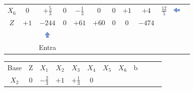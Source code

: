 \begin{frame}
{\begin{table}
\begin{tabular}{c c c c c c c c c c c c}
				\cellcolor{blue!100} \color{red} $\scriptstyle X_6$
				& \cellcolor{yellow!50} $\scriptstyle 0$
				& \cellcolor{gray!50} $\scriptstyle +\frac{5}{3}$
				& \cellcolor{yellow!50} $\scriptstyle 0$
				& \cellcolor{yellow!50} $\scriptstyle -\frac{1}{3}$
				& \cellcolor{yellow!50} $\scriptstyle 0$
				& \cellcolor{yellow!50} $\scriptstyle 0$
				& \cellcolor{yellow!50} $\scriptstyle +1$
				& \cellcolor{gray!50} $\scriptstyle +4$ 
				& $ \scriptstyle \frac{12}{5}$ & \includegraphics[width=0.3cm,height=0.3cm]{setaesquerda.jpg}\\
				\cellcolor{blue!100} \color{white} $\scriptstyle Z$
				& \cellcolor{yellow!50} $\scriptstyle +1$
				& \cellcolor{gray!50} $\scriptstyle -244$
				& \cellcolor{yellow!50} $\scriptstyle 0$
				& \cellcolor{yellow!50} $\scriptstyle +61$
				& \cellcolor{yellow!50} $\scriptstyle +60$
				& \cellcolor{yellow!50} $\scriptstyle 0$
				& \cellcolor{yellow!50} $\scriptstyle 0$ 
				& \cellcolor{gray!50} $\scriptstyle -474$  \\
				& & \includegraphics[width=0.3cm,height=0.3cm]{setacima.jpg} \\
				& & \scriptsize Entra \\
			\end{tabular}
		\end{table}			
	}
	{
		\begin{table}		
			\begin{tabular}{c c c c c c c c c c c c}
				\cellcolor{blue!100} \color{white} \scriptsize Base 
				&\cellcolor{blue!100} \color{white} \scriptsize Z 
				&\cellcolor{blue!100} \color{white} $\scriptstyle X_1$ 
				&\cellcolor{blue!100} \color{red} $\scriptstyle X_2$ 
				&\cellcolor{blue!100} \color{white}   $\scriptstyle X_3$ 
				&\cellcolor{blue!100} \color{white} $\scriptstyle X_4$ 
				&\cellcolor{blue!100} \color{red}   $\scriptstyle X_5$ 
				&\cellcolor{blue!100} \color{red}   $\scriptstyle X_6$ 
				&\cellcolor{blue!100} \color{white} \scriptsize b
				&
				&
				& \\
				\cellcolor{blue!100} \color{red} $\scriptstyle X_2$
				& \cellcolor{yellow!50} $\scriptstyle 0$
				& \cellcolor{gray!50} $\scriptstyle -\frac{2}{3}$
				& \cellcolor{yellow!50} $\scriptstyle +1$
				& \cellcolor{yellow!50} $\scriptstyle +\frac{1}{3}$
				& \cellcolor{yellow!50} $\scriptstyle 0$

\end{tabular}
\end{table}}
\end{frame}
